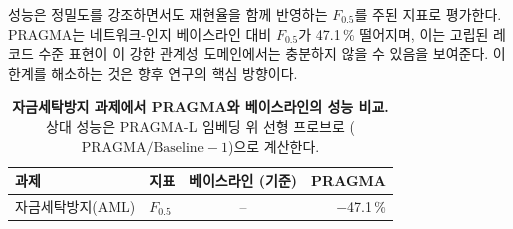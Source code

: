 성능은 정밀도를 강조하면서도 재현율을 함께 반영하는 $F_\text{0.5}$를 주된 지표로 평가한다.
PRAGMA는 네트워크-인지 베이스라인 대비 $F_\text{0.5}$가 47.1\,\% 떨어지며, 이는 고립된 레코드 수준 표현이 이 강한 관계성 도메인에서는 충분하지 않을 수 있음을 보여준다.
이 한계를 해소하는 것은 향후 연구의 핵심 방향이다.

\begin{table}[t]
\centering
\begin{tabular}{llcr}
\textbf{과제}               & \textbf{지표}   & \textbf{베이스라인 (기준)} & \textbf{PRAGMA} \\
\midrule
자금세탁방지(AML)       & $F_\text{0.5}$    & --                     & $-$47.1\,\%        \\
\end{tabular}
\caption{
    \textbf{자금세탁방지 과제에서 PRAGMA와 베이스라인의 성능 비교.}
    상대 성능은 PRAGMA-L 임베딩 위 선형 프로브로 ($\text{PRAGMA} / \text{Baseline} - 1$)으로 계산한다.
    }
    \label{tab:aml_results}
\end{table}
